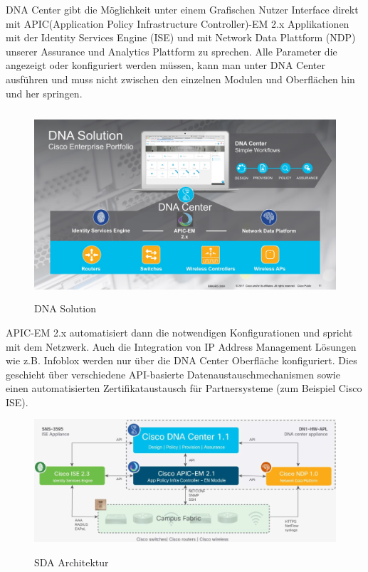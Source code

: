 DNA Center gibt die Möglichkeit unter einem Grafischen Nutzer Interface direkt mit APIC(Application Policy Infrastructure Controller)-EM 2.x Applikationen mit der Identity Services Engine (ISE) und mit Network Data Plattform (NDP) unserer Assurance und Analytics Plattform zu sprechen. Alle Parameter die angezeigt oder konfiguriert werden müssen, kann man unter DNA Center ausführen und muss nicht zwischen den einzelnen Modulen und Oberflächen hin und her springen.
\begin{figure}[H]
	\centering
	\includegraphics[height=7cm]{img/DNAC-1.jpg}
	\caption{DNA Solution}
	\label{fig:Aufbau einer DNA Solution}
\end{figure}
APIC-EM 2.x automatisiert dann die notwendigen Konfigurationen und spricht mit dem Netzwerk. Auch die Integration von IP Address Management Lösungen wie z.B. Infoblox werden nur über die DNA Center Oberfläche konfiguriert. Dies geschieht über verschiedene API-basierte Datenaustauschmechanismen sowie einen automatisierten Zertifikataustausch für Partnersysteme (zum Beispiel Cisco ISE). \cite{sda-whitepaper} \\

\begin{figure}[H]
	\centering
	\includegraphics[width=1\linewidth]{img/ControllerLayer.png}\\[1px]
	\caption{SDA Architektur} 
	\label{fig:SDA Architektur}
\end{figure}

